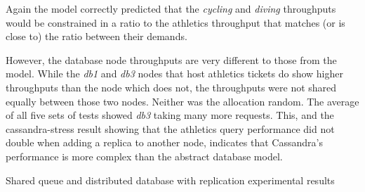 \documentclass[runningheads]{llncs}
\begin{document}
Again the model correctly predicted that the {\itshape cycling} and {\itshape diving} throughputs would be constrained in a ratio to the athletics throughput that matches (or is close to) the ratio between their demands.

However, the database node throughputs are very different to those from the model.  While the {\itshape db1} and {\itshape db3} nodes that host athletics tickets do show higher throughputs than the node which does not, the throughputs were not shared equally between those two nodes.  Neither was the allocation random.  The average of all five sets of tests showed {\itshape db3} taking many more requests.  This, and the cassandra-stress result showing that the athletics query performance did not double when adding a replica to another node, indicates that Cassandra's performance is more complex than the abstract database model.

\begin{table}[h!]
	\centering
	\caption{Shared queue and distributed database with replication experimental results}
	\label{table:builtddwr_results}
\end{table}
\end{document}
